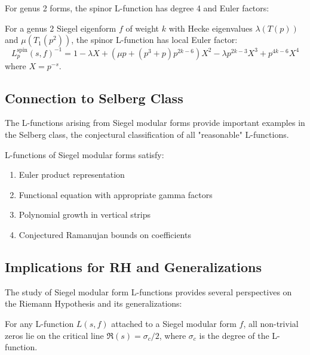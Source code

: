 For genus 2 forms, the spinor L-function has degree 4 and Euler factors:

\begin{theorem}
\label{thm:genus2_spinor}
For a genus 2 Siegel eigenform $f$ of weight $k$ with Hecke eigenvalues $\lambda(T(p))$ and $\mu(T_1(p^2))$, the spinor L-function has local Euler factor:
\begin{equation}
L_p^{\text{spin}}(s,f)^{-1} = 1 - \lambda X + (\mu p + (p^3 + p)p^{2k-6})X^2 - \lambda p^{2k-3} X^3 + p^{4k-6} X^4
\end{equation}
where $X = p^{-s}$.
\end{theorem}

\subsection{Connection to Selberg Class}

The L-functions arising from Siegel modular forms provide important examples in the Selberg class, the conjectural classification of all "reasonable" L-functions.

\begin{theorem}
\label{thm:selberg_properties}
L-functions of Siegel modular forms satisfy:
\begin{enumerate}
\item Euler product representation
\item Functional equation with appropriate gamma factors
\item Polynomial growth in vertical strips
\item Conjectured Ramanujan bounds on coefficients
\end{enumerate}
\end{theorem}

\subsection{Implications for RH and Generalizations}

The study of Siegel modular form L-functions provides several perspectives on the Riemann Hypothesis and its generalizations:

\begin{conjecture}
\label{conj:grh_siegel}
For any L-function $L(s,f)$ attached to a Siegel modular form $f$, all non-trivial zeros lie on the critical line $\Re(s) = \sigma_c/2$, where $\sigma_c$ is the degree of the L-function.
\end{conjecture}

